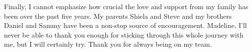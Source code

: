 \documentclass[12pt]{book}
\begin{document}
Finally, I cannot emphasize how crucial the love and support from my family
has been over the past five years. My parents Shiela and Steve and my brothers
Daniel and Sammy have been a non-stop source of encouragement.
Madeline, I'll never be able to thank you enough for sticking through this whole
journey with me, but I will certainly try. Thank you for always being on my team.


\clearpage

\pagestyle{headings}
\setcounter{page}{1}
\renewcommand{\chaptermark}[1]{\markboth{\sc{\chaptername\ \thechapter.\ #1}}{}}
\renewcommand{\sectionmark}[1]{\markright{\sc{\thesection.\ #1}}{}}




\clearpage
{}
\singlespacing


\end{document}
